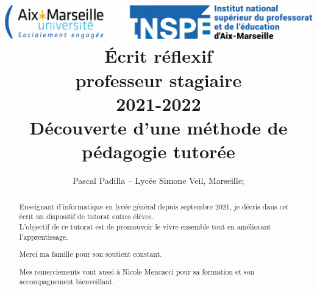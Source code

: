 \documentclass[a4paper, 12pt]{article}
\title{%
  {\includegraphics[width=\linewidth]{res/inspe}}
  \\[2cm]
  Écrit réflexif\\professeur stagiaire\\2021-2022 
  \\[4cm]
  \textbf{Découverte d'une méthode de pédagogie tutorée}
  \vspace{2cm}
}
\author{Pascal Padilla -- Lyc\'ee Simone Veil, Marseille; \email{pascal.padilla@ax-aix-marseille.fr}}
\begin{document}
  \renewcommand{\labelitemi}{\textbullet}

  \maketitle
  \thispagestyle{empty}



  \newpage



  \begin{abstract}
    \vspace{2cm}
    Enseignant d'informatique en lycée général depuis septembre 2021, je décris dans cet écrit un dispositif de tutorat entres élèves.
    \\
    L'objectif de ce tutorat est de promouvoir le vivre ensemble tout en améliorant l'apprentissage.

    Merci ma famille pour son soutient constant.
    
    Mes remerciements vont aussi à Nicole Mencacci pour sa formation et son accompagnement bienveillant.
  \end{abstract}



  \newpage



  \tableofcontents



  \newpage



  \clearpage


  
\end{document}
